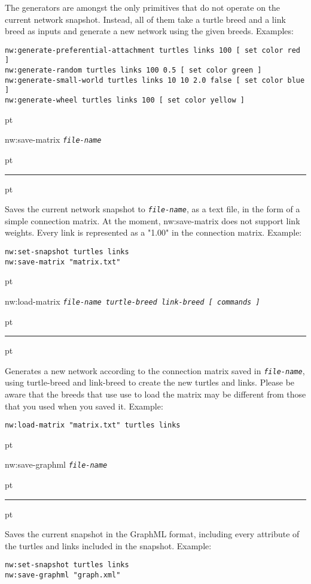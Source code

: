 \documentclass[10pt]{article}
\newenvironment{prim}{
  \leftskip 0cm
  \vskip 6 pt
  \ttfamily
  \bfseries
}{
  \vskip 2 pt
  \hrule
  \vskip 6 pt
}
\newcommand{\param}[1]{\texttt{\textit{\textmd{#1}}}}
\newcommand{\cat}[1]{\vspace{1 em}{\parindent -1cm \scshape \bfseries \large
#1}}
\begin{document}
The generators are amongst the only primitives that do not operate on the
current network snapshot. Instead, all of them take a turtle breed and a link
breed as inputs and generate a new network using the given breeds. Examples:

\begin{Verbatim}
nw:generate-preferential-attachment turtles links 100 [ set color red ]
nw:generate-random turtles links 100 0.5 [ set color green ]
nw:generate-small-world turtles links 10 10 2.0 false [ set color blue ]
nw:generate-wheel turtles links 100 [ set color yellow ]
\end{Verbatim}

\cat{Import/Export Primitives}

\begin{prim}
nw:save-matrix \param{file-name}
\end{prim}

Saves the current network snapshot to \param{file-name}, as a text file, in the
form of a simple connection matrix. At the moment, nw:save-matrix does not
support link weights. Every link is represented as a "1.00" in the connection
matrix. Example:

\begin{Verbatim}
nw:set-snapshot turtles links
nw:save-matrix "matrix.txt"
\end{Verbatim}

\begin{prim}
nw:load-matrix \param{file-name turtle-breed link-breed [ commands ]}
\end{prim}

Generates a new network according to the connection matrix saved in
\param{file-name}, using turtle-breed and link-breed to create the new turtles
and links. Please be aware that the breeds that use use to load the matrix may
be different from those that you used when you saved it. Example:

\begin{Verbatim}
nw:load-matrix "matrix.txt" turtles links
\end{Verbatim}

\begin{prim}
nw:save-graphml \param{file-name}
\end{prim}

Saves the current snapshot in the GraphML format, including every attribute of
the turtles and links included in the snapshot. Example:
\begin{Verbatim}
nw:set-snapshot turtles links
nw:save-graphml "graph.xml"
\end{Verbatim}
\end{document}
